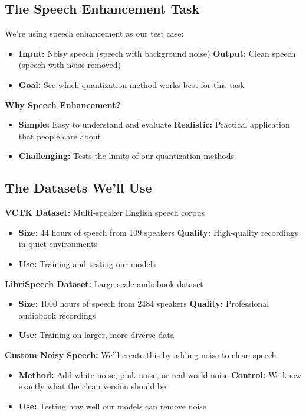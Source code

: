 \documentclass[12pt]{article}
\begin{document}
\subsection{The Speech Enhancement Task}

We're using speech enhancement as our test case:
\begin{itemize}
    \item \textbf{Input:} Noisy speech (speech with background noise)
    \textbf{Output:} Clean speech (speech with noise removed)
    \item \textbf{Goal:} See which quantization method works best for this task
\end{itemize}

\textbf{Why Speech Enhancement?}
\begin{itemize}
    \item \textbf{Simple:} Easy to understand and evaluate
    \textbf{Realistic:} Practical application that people care about
    \item \textbf{Challenging:} Tests the limits of our quantization methods
\end{itemize}

\subsection{The Datasets We'll Use}

\textbf{VCTK Dataset:} Multi-speaker English speech corpus
\begin{itemize}
    \item \textbf{Size:} 44 hours of speech from 109 speakers
    \textbf{Quality:} High-quality recordings in quiet environments
    \item \textbf{Use:} Training and testing our models
\end{itemize}

\textbf{LibriSpeech Dataset:} Large-scale audiobook dataset
\begin{itemize}
    \item \textbf{Size:} 1000 hours of speech from 2484 speakers
    \textbf{Quality:} Professional audiobook recordings
    \item \textbf{Use:} Training on larger, more diverse data
\end{itemize}

\textbf{Custom Noisy Speech:} We'll create this by adding noise to clean speech
\begin{itemize}
    \item \textbf{Method:} Add white noise, pink noise, or real-world noise
    \textbf{Control:} We know exactly what the clean version should be
    \item \textbf{Use:} Testing how well our models can remove noise
\end{itemize}
\end{document}
